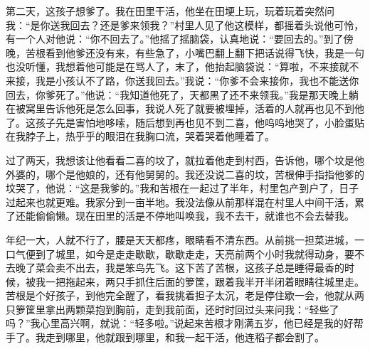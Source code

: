 \documentclass[12pt,UTF8]{ctexbook}
\begin{document}
第二天，这孩子想爹了。我在田里干活，他坐在田埂上玩，玩着玩着突然问我：“是你送我回去？还是爹来领我？”村里人见了他这模样，都摇着头说他可怜，有一个人对他说：“你不回去了。”他摇了摇脑袋，认真地说：“要回去的。”到了傍晚，苦根看到他爹还没有来，有些急了，小嘴巴翻上翻下把话说得飞快，我是一句也没听懂，我想着他可能是在骂人了，末了，他抬起脑袋说：“算啦，不来接就不来接，我是小孩认不了路，你送我回去。”我说：“你爹不会来接你，我也不能送你回去，你爹死了。”他说：“我知道他死了，天都黑了还不来领我。”我是那天晚上躺在被窝里告诉他死是怎么回事，我说人死了就要被埋掉，活着的人就再也见不到他了。这孩子先是害怕地哆嗦，随后想到再也见不到二喜，他呜呜地哭了，小脸蛋贴在我脖子上，热乎乎的眼泪在我胸口流，哭着哭着他睡着了。

过了两天，我想该让他看看二喜的坟了，就拉着他走到村西，告诉他，哪个坟是他外婆的，哪个是他娘的，还有他舅舅的。我还没说二喜的坟，苦根伸手指指他爹的坟哭了，他说：“这是我爹的。”我和苦根在一起过了半年，村里包产到户了，日子过起来也就更难。我家分到一亩半地。我没法像从前那样混在村里人中间干活，累了还能偷偷懒。现在田里的活是不停地叫唤我，我不去干，就谁也不会去替我。

年纪一大，人就不行了，腰是天天都疼，眼睛看不清东西。从前挑一担菜进城，一口气便到了城里，如今是走走歇歇，歇歇走走，天亮前两个小时我就得动身，要不去晚了菜会卖不出去，我是笨鸟先飞。这下苦了苦根，这孩子总是睡得最香的时候，被我一把拖起来，两只手抓住后面的箩筐，跟着我半开半闭着眼睛往城里走。苦根是个好孩子，到他完全醒了，看我挑着担子太沉，老是停住歇一会，他就从两只箩筐里拿出两颗菜抱到胸前，走到我前面，还时时回过头来问我：“轻些了吗？”我心里高兴啊，就说：“轻多啦。”说起来苦根才刚满五岁，他已经是我的好帮手了。我走到哪里，他就跟到哪里，和我一起干活，他连稻子都会割了。
\end{document}
